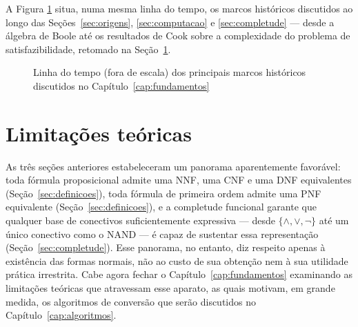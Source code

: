 \documentclass[12pt,a4paper,oneside]{report}
\theoremstyle{tituloplain}
\theoremstyle{titulodef}
\begin{document}
A Figura \ref{fig:linha-tempo} situa, numa mesma linha do tempo, os marcos históricos discutidos ao longo das Seções~\ref{sec:origens}, \ref{sec:computacao} e \ref{sec:completude} — desde a álgebra de Boole até os resultados de Cook sobre a complexidade do problema de satisfazibilidade, retomado na Seção~\ref{sec:limitacoes}.
 
\begin{figure}[htbp]
\centering
{}
\caption{Linha do tempo (fora de escala) dos principais marcos históricos discutidos no Capítulo~\ref{cap:fundamentos}}
\label{fig:linha-tempo}
\end{figure}

\section{Limitações teóricas}\label{sec:limitacoes}

As três seções anteriores estabeleceram um panorama aparentemente favorável: toda fórmula proposicional admite uma NNF, uma CNF e uma DNF equivalentes (Seção~\ref{sec:definicoes}), toda fórmula de primeira ordem admite uma PNF equivalente (Seção~\ref{sec:definicoes}), e a completude funcional garante que qualquer base de conectivos suficientemente expressiva — desde $\{\wedge, \vee, \neg\}$ até um único conectivo como o NAND — é capaz de sustentar essa representação (Seção~\ref{sec:completude}). Esse panorama, no entanto, diz respeito apenas à existência das formas normais, não ao custo de sua obtenção nem à sua utilidade prática irrestrita. Cabe agora fechar o Capítulo~\ref{cap:fundamentos} examinando as limitações teóricas que atravessam esse aparato, as quais motivam, em grande medida, os algoritmos de conversão que serão discutidos no Capítulo~\ref{cap:algoritmos}.
 
\end{document}
